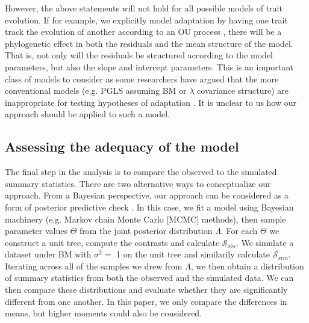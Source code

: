 \documentclass[a4paper,12pt]{article}
\begin{document}
However, the above statements will not hold for all possible models of trait evolution. If for example, we explicitly model adaptation by having one trait track the evolution of another according to an OU process \citep[see][]{Hansen2008, Labra2009, Bartoszek2012}, there will be a phylogenetic effect in both the residuals and the mean structure of the model. That is, not only will the residuals be structured according to the model parameters, but also the slope and intercept parameters. This is an important class of models to consider as some researchers have argued that the more conventional models (e.g. PGLS assuming BM or $\lambda$ covariance structure) are inappropriate for testing hypotheses of adaptation \citep{HansenOrzack2005, Hansen2012}. It is unclear to us how our approach should be applied to such a model.


\subsection{Assessing the adequacy of the model}
The final step in the analysis is to compare the observed to the simulated summary statistics. There are two alternative ways to conceptualize our approach. From a Bayesian perspective, our approach can be considered as a form of posterior predictive check \citep{Rubin1984, Gelman1996}. In this case, we fit a model using Bayesian machinery (e.g. Markov chain Monte Carlo [MCMC] methods), then sample parameter values $\Theta$ from the joint posterior distribution $\Lambda$. For each $\Theta$ we construct a unit tree, compute the contrasts and calculate $\mathcal{S}_{obs}$. We simulate a dataset under BM with $\sigma^2 =$ 1 on the unit tree and similarily calculate $\mathcal{S}_{sim}$. Iterating across all of the samples we drew from $\Lambda$, we then obtain a distribution of summary statistics from both the observed and the simulated data. We can then compare these distributions and evaluate whether they are significantly different from one another. In this paper, we only compare the differences in means, but higher moments could also be considered. 
\end{document}
